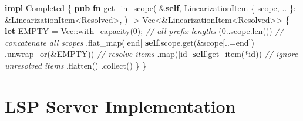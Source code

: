 \documentclass[
  a4paper,
  bibtex,
  english,
  nomenclature]{kthlatex/kththesis/kththesis}
\newenvironment{Shaded}{}{}
\newcommand{\CommentTok}[1]{\textcolor[rgb]{0.38,0.63,0.69}{\textit{#1}}}
\newcommand{\DataTypeTok}[1]{\textcolor[rgb]{0.56,0.13,0.00}{#1}}
\newcommand{\DecValTok}[1]{\textcolor[rgb]{0.25,0.63,0.44}{#1}}
\newcommand{\KeywordTok}[1]{\textcolor[rgb]{0.00,0.44,0.13}{\textbf{#1}}}
\newcommand{\NormalTok}[1]{#1}
\newcommand{\OperatorTok}[1]{\textcolor[rgb]{0.40,0.40,0.40}{#1}}
\newcommand{\PreprocessorTok}[1]{\textcolor[rgb]{0.74,0.48,0.00}{#1}}
\begin{document}
\begin{codelisting}

\caption{Resolution of all items in scope}

\hypertarget{lst:nls-resolve-scope}{%
\label{lst:nls-resolve-scope}}%
\begin{Shaded}
\begin{Highlighting}[]
\KeywordTok{impl}\NormalTok{ Completed }\OperatorTok{\{}
  \KeywordTok{pub} \KeywordTok{fn}\NormalTok{ get\_in\_scope(}
    \OperatorTok{\&}\KeywordTok{self}\OperatorTok{,}
\NormalTok{    LinearizationItem }\OperatorTok{\{}\NormalTok{ scope}\OperatorTok{,} \OperatorTok{..} \OperatorTok{\}:} \OperatorTok{\&}\NormalTok{LinearizationItem}\OperatorTok{\textless{}}\NormalTok{Resolved}\OperatorTok{\textgreater{},}
\NormalTok{  ) }\OperatorTok{{-}\textgreater{}} \DataTypeTok{Vec}\OperatorTok{\textless{}\&}\NormalTok{LinearizationItem}\OperatorTok{\textless{}}\NormalTok{Resolved}\OperatorTok{\textgreater{}\textgreater{}} \OperatorTok{\{}
    \KeywordTok{let}\NormalTok{ EMPTY }\OperatorTok{=} \DataTypeTok{Vec}\PreprocessorTok{::}\NormalTok{with\_capacity(}\DecValTok{0}\NormalTok{)}\OperatorTok{;}
    \CommentTok{// all prefix lengths}
\NormalTok{    (}\DecValTok{0}\OperatorTok{..}\NormalTok{scope}\OperatorTok{.}\NormalTok{len())}
      \CommentTok{// concatenate all scopes}
      \OperatorTok{.}\NormalTok{flat\_map(}\OperatorTok{|}\NormalTok{end}\OperatorTok{|} \KeywordTok{self}\OperatorTok{.}\NormalTok{scope}\OperatorTok{.}\NormalTok{get(}\OperatorTok{\&}\NormalTok{scope[}\OperatorTok{..=}\NormalTok{end])}
        \OperatorTok{.}\NormalTok{unwrap\_or(}\OperatorTok{\&}\NormalTok{EMPTY))}
      \CommentTok{// resolve items}
      \OperatorTok{.}\NormalTok{map(}\OperatorTok{|}\NormalTok{id}\OperatorTok{|} \KeywordTok{self}\OperatorTok{.}\NormalTok{get\_item(}\OperatorTok{*}\NormalTok{id))}
      \CommentTok{// ignore unresolved items}
      \OperatorTok{.}\NormalTok{flatten()}
      \OperatorTok{.}\NormalTok{collect()}
  \OperatorTok{\}}
\OperatorTok{\}}
\end{Highlighting}
\end{Shaded}

\end{codelisting}

\hypertarget{sec:lsp-server-implementation}{%
\section{LSP Server
Implementation}\label{sec:lsp-server-implementation}}
\end{document}
